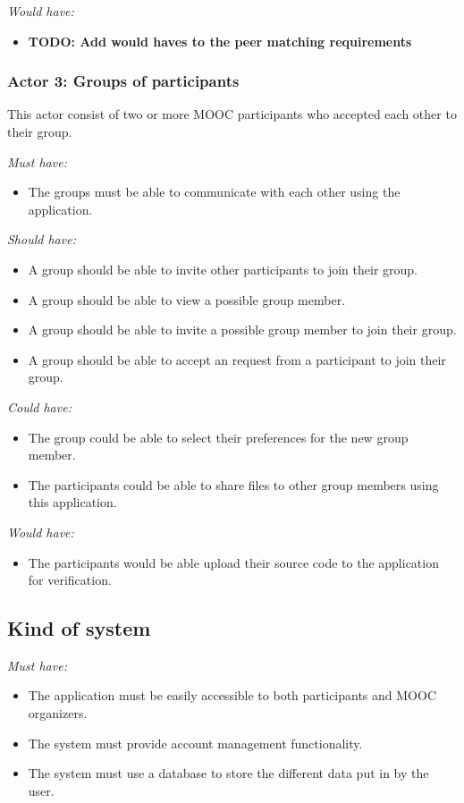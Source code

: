\documentclass[]{article}
\newcommand{\TODO}[1]{{\color{red}\textbf{TODO: #1}}}
\newcommand{\reqr}[1]{{\noindent\emph{#1:}}}
\begin{document}
\reqr{Would have}
\begin{itemize}
\item \TODO{Add would haves to the peer matching requirements}
\end{itemize}


\subsubsection{Actor 3: Groups of participants}
This actor consist of two or more MOOC participants who accepted each other to their group.

\reqr{Must have}
\begin{itemize}
\item The groups must be able to communicate with each other using the application.
\end{itemize}

\reqr{Should have}
\begin{itemize}
\item A group should be able to invite other participants to join their group.
\item A group should be able to view a possible group member.
\item A group should be able to invite a possible group member to join their group.
\item A group should be able to accept an request from a participant to join their group.
\end{itemize}

\reqr{Could have}
\begin{itemize}
\item The group could be able to select their preferences for the new group member.
\item The participants could be able to share files to other group members using this application.
\end{itemize}

\reqr{Would have}
\begin{itemize}
\item The participants would be able upload their source code to the application for verification.
\end{itemize}

\subsection{Kind of system}

\reqr{Must have}
\begin{itemize}
\item The application must be easily accessible to both participants and MOOC organizers.
\item The system must provide account management functionality.
\item The system must use a database to store the different data put in by the user.
\end{itemize}
\end{document}

